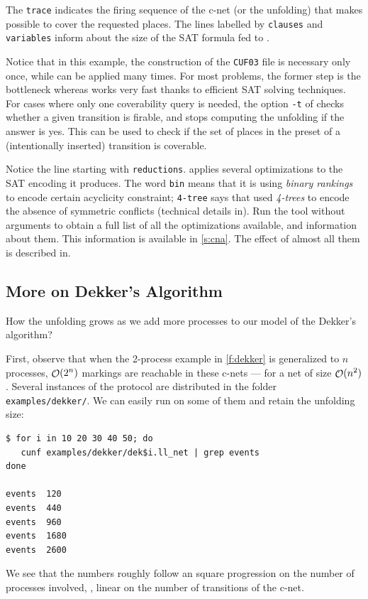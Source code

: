 \documentclass[a4paper]{refart}
\begin{document}
The \verb!trace! indicates the firing sequence of the c-net (or the unfolding)
that makes possible to cover the requested places.
The lines labelled by \verb!clauses! and \verb!variables! inform about the
size of the SAT formula fed to \minisat.

Notice that in this example, the construction of the \verb!CUF03! file
is necessary only once, while \cna can be applied many times. For most
problems, the former step is the bottleneck whereas \cna works very fast
thanks to efficient SAT solving techniques. For cases where only one
coverability query is needed,
the option \verb!-t! of \cunf checks whether a given transition is
firable, and stops computing the unfolding if the answer is yes.
This can be used to check if the set of places in the preset of
a (intentionally inserted) transition is coverable.

Notice the line starting with \verb!reductions!.
\cna applies several optimizations to the SAT encoding it produces.
The word \verb!bin! means that it is using \emph{binary rankings} to
encode certain acyclicity constraint;
\verb!4-tree! says that \cna used
\textit{4-trees} to encode the absence of symmetric conflicts
(technical details in\cite{RS12,RS12rr}).
Run the tool without arguments to obtain a full list of all the
optimizations available, and information about them.
This information is available in \cref{s:cna}.
The effect of almost all them is described in\cite{RS12rr}.

\subsection{More on Dekker's Algorithm}%
\label{s:dekker}

How the unfolding grows as we add more processes to our model of the
Dekker's algorithm?

First, observe that when the 2-process example in \cref{f:dekker} is
generalized to $n$ processes, $\mathop{\mathcal{O}} (2^n)$ markings are
reachable in these c-nets --- for a net of size $\mathop{\mathcal{O}} (n^2)$.
Several instances of the protocol are distributed in the folder
\verb!examples/dekker/!.  We can easily run \cunf on some of them and retain
the unfolding size:
\begin{verbatim}
$ for i in 10 20 30 40 50; do
   cunf examples/dekker/dek$i.ll_net | grep events
done

events  120
events  440
events  960
events  1680
events  2600
\end{verbatim}
We see that the numbers roughly follow an square progression on the number of
processes involved, \ie, linear on the number of transitions of the c-net.
\end{document}

